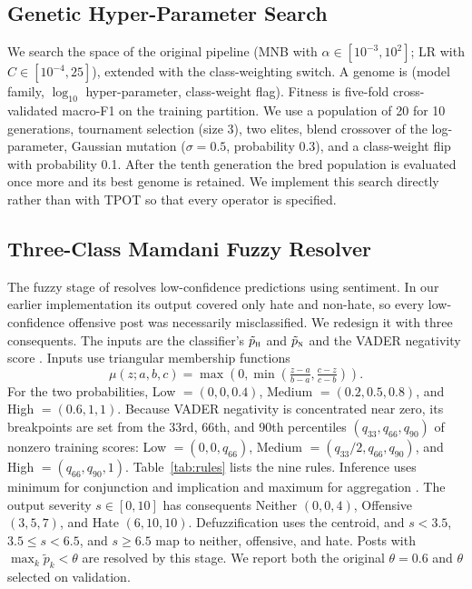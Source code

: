 \documentclass[lettersize,journal]{IEEEtran}
\begin{document}
\subsection{Genetic Hyper-Parameter Search}
We search the space of the original pipeline \cite{ketsbaia2023multistage} (MNB with $\alpha\in[10^{-3},10^{2}]$; LR with $C\in[10^{-4},25]$), extended with the class-weighting switch. A genome is (model family, $\log_{10}$ hyper-parameter, class-weight flag). Fitness is five-fold cross-validated macro-F1 on the training partition. We use a population of 20 for 10 generations, tournament selection (size 3), two elites, blend crossover of the log-parameter, Gaussian mutation ($\sigma=0.5$, probability 0.3), and a class-weight flip with probability 0.1. After the tenth generation the bred population is evaluated once more and its best genome is retained. We implement this search directly rather than with TPOT so that every operator is specified.

\subsection{Three-Class Mamdani Fuzzy Resolver}\label{sec:fuzzydesign}
The fuzzy stage of \cite{ketsbaia2023multistage} resolves low-confidence predictions using sentiment. In our earlier implementation its output covered only hate and non-hate, so every low-confidence offensive post was necessarily misclassified. We redesign it with three consequents. The inputs are the classifier's $\tilde{p}_{\textsc{h}}$ and $\tilde{p}_{\textsc{n}}$ and the VADER negativity score \cite{hutto2014vader}. Inputs use triangular membership functions
\begin{equation}
\mu(z;a,b,c) = \max\!\left(0,\min\!\left(\tfrac{z-a}{b-a},\tfrac{c-z}{c-b}\right)\right).
\end{equation}
For the two probabilities, Low $=(0,0,0.4)$, Medium $=(0.2,0.5,0.8)$, and High $=(0.6,1,1)$. Because VADER negativity is concentrated near zero, its breakpoints are set from the 33rd, 66th, and 90th percentiles $(q_{33},q_{66},q_{90})$ of nonzero training scores: Low $=(0,0,q_{66})$, Medium $=(q_{33}/2,q_{66},q_{90})$, and High $=(q_{66},q_{90},1)$. Table~\ref{tab:rules} lists the nine rules. Inference uses minimum for conjunction and implication and maximum for aggregation \cite{mamdani1975experiment}. The output severity $s\in[0,10]$ has consequents Neither $(0,0,4)$, Offensive $(3,5,7)$, and Hate $(6,10,10)$. Defuzzification uses the centroid, and $s<3.5$, $3.5\le s<6.5$, and $s\ge6.5$ map to neither, offensive, and hate. Posts with $\max_k\tilde{p}_k<\theta$ are resolved by this stage. We report both the original $\theta=0.6$ and $\theta$ selected on validation.
\end{document}

